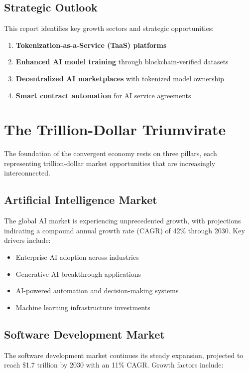 \documentclass[11pt,a4paper]{report}
\begin{document}
\section*{Strategic Outlook}

This report identifies key growth sectors and strategic opportunities:

\begin{enumerate}
\item \textbf{Tokenization-as-a-Service (TaaS) platforms}
\item \textbf{Enhanced AI model training} through blockchain-verified datasets
\item \textbf{Decentralized AI marketplaces} with tokenized model ownership
\item \textbf{Smart contract automation} for AI service agreements
\end{enumerate}

\chapter{The Trillion-Dollar Triumvirate}

The foundation of the convergent economy rests on three pillars, each representing trillion-dollar market opportunities that are increasingly interconnected.

\section{Artificial Intelligence Market}

The global AI market is experiencing unprecedented growth, with projections indicating a compound annual growth rate (CAGR) of 42\% through 2030. Key drivers include:

\begin{itemize}
\item Enterprise AI adoption across industries
\item Generative AI breakthrough applications
\item AI-powered automation and decision-making systems
\item Machine learning infrastructure investments
\end{itemize}

\section{Software Development Market}

The software development market continues its steady expansion, projected to reach \$1.7 trillion by 2030 with an 11\% CAGR. Growth factors include:
\end{document}
